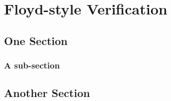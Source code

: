 \chapter{Floyd-style Verification}\label{ch:floyd}
\lipsum[1]

\section{One Section}\label{se:one_section}
\lipsum[2]

\subsection{A sub-section}\label{ss:this_subsection}
\lipsum[1-4]

\section{Another Section}\label{se:another_section}
\lipsum[1-2]
